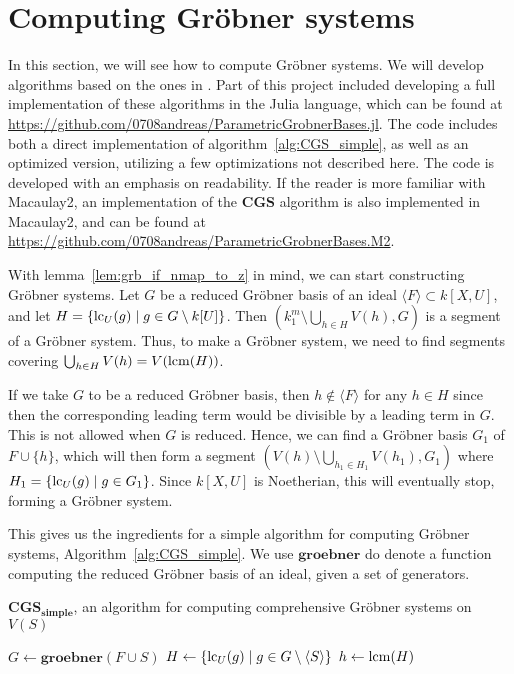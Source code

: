 \section{Computing Gröbner systems}
In this section, we will see how to compute Gröbner systems. We will develop algorithms based on the ones in \cite{ss_algo}. Part of this project included developing a full implementation of these algorithms in the Julia language, which can be found at \url{https://github.com/0708andreas/ParametricGrobnerBases.jl}. The code includes both a direct implementation of algorithm~\ref{alg:CGS_simple}, as well as an optimized version, utilizing a few optimizations not described here. The code is developed with an emphasis on readability. If the reader is more familiar with Macaulay2, an implementation of the $\mathbf{CGS}$ algorithm is also implemented in Macaulay2, and can be found at \url{https://github.com/0708andreas/ParametricGrobnerBases.M2}.

With lemma~\ref{lem:grb_if_nmap_to_z} in mind, we can start constructing Gröbner systems. Let $G$ be a reduced Gröbner basis of an ideal $\langle F \rangle \subset k[X, U]$, and let $H = \{\operatorname{lc}_{U}(g) \mid g \in G \setminus k[U]\}$. Then $\left(k_{1}^{m} \setminus \bigcup_{h \in H} V(h), G\right)$ is a segment of a Gröbner system. Thus, to make a Gröbner system, we need to find segments covering $\bigcup_{h \in H} V(h) = V(\operatorname{lcm}(H))$.

If we take $G$ to be a reduced Gröbner basis, then $h \notin \langle F \rangle$ for any $h \in H$ since then the corresponding leading term would be divisible by a leading term in $G$. This is not allowed when $G$ is reduced. Hence, we can find a Gröbner basis $G_{1}$ of $F \cup \{h\}$, which will then form a segment $(V(h) \setminus \bigcup_{h_{1} \in H_{1}} V(h_{1}), G_{1})$ where $H_{1} = \{\operatorname{lc}_{U}(g) \mid g \in G_{1}\}$. Since $k[X, U]$ is Noetherian, this will eventually stop, forming a Gröbner system.

This gives us the ingredients for a simple algorithm for computing Gröbner systems, Algorithm~\ref{alg:CGS_simple}. We use $\mathbf{groebner}$ do denote a function computing the reduced Gröbner basis of an ideal, given a set of generators.

\begin{algorithm}
  \caption{$\mathbf{CGS_{simple}}$, an algorithm for computing comprehensive Gröbner systems on $V(S)$}%
  \label{alg:CGS_simple}
    {
    \KwRet{\emptyset}\;
  } {
    $G \gets \mathbf{groebner}(F \cup S)$\;
    $H \gets \{\operatorname{lc}_{U}(g) \mid g \in G \setminus \langle S \rangle\}$\;
    $h \gets \operatorname{lcm}(H)$\;
  }
\end{algorithm}

